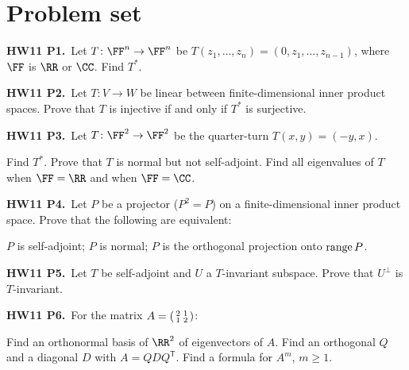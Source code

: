 \documentclass[10pt]{scrartcl}
\begin{document}
\section{Problem set}

\begin{prob}
  \textbf{HW11 P1.}\ Let $T\colon\FF^n\to\FF^n$ be $T(z_1,\dots,z_n)=(0,z_1,\dots,z_{n-1})$, where $\FF$ is $\RR$ or $\CC$. Find $T^*$.
\end{prob}

\begin{prob}
  \textbf{HW11 P2.}\ Let $T\colon V\to W$ be linear between finite-dimensional inner product spaces. Prove that $T$ is injective if and only if $T^*$ is surjective.
\end{prob}

\begin{prob}
  \textbf{HW11 P3.}\ Let $T\colon\FF^2\to\FF^2$ be the quarter-turn $T(x,y)=(-y,x)$.
  \begin{enumerate}[(a)]
    \ii Find $T^*$.
    \ii Prove that $T$ is normal but not self-adjoint.
    \ii Find all eigenvalues of $T$ when $\FF=\RR$ and when $\FF=\CC$.
  \end{enumerate}
\end{prob}

\begin{prob}
  \textbf{HW11 P4.}\ Let $P$ be a projector ($P^2=P$) on a finite-dimensional inner product space. Prove that the following are equivalent:
  \begin{enumerate}[(a)]
    \ii $P$ is self-adjoint;
    \ii $P$ is normal;
    \ii $P$ is the orthogonal projection onto $\operatorname{range} P$.
  \end{enumerate}
\end{prob}

\begin{prob}
  \textbf{HW11 P5.}\ Let $T$ be self-adjoint and $U$ a $T$-invariant subspace. Prove that $U^\perp$ is $T$-invariant.
\end{prob}

\begin{prob}
  \textbf{HW11 P6.}\ For the matrix $A=\begin{psmallmatrix}2&1\\1&2\end{psmallmatrix}$:
  \begin{enumerate}[(a)]
    \ii Find an orthonormal basis of $\RR^2$ of eigenvectors of $A$.
    \ii Find an orthogonal $Q$ and a diagonal $D$ with $A=QDQ^{\mathsf T}$.
    \ii Find a formula for $A^m$, $m\ge1$.
  \end{enumerate}
\end{prob}
\end{document}

